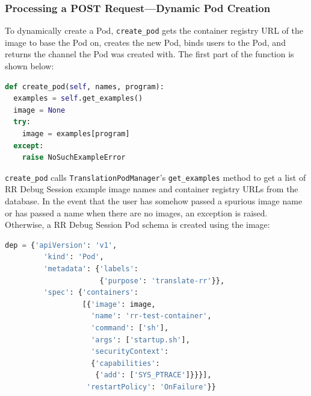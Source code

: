 \documentclass[12pt]{article}
\begin{document}


\subsubsection{Processing a POST Request---Dynamic Pod Creation} \label{dynamicc}

To dynamically create a Pod, \lstinline{create_pod} gets the container
registry URL of the image to base the Pod on, creates the new Pod,
binds users to the Pod, and returns the channel the Pod was created
with.  The first part of the function is shown below:

\begin{lstlisting}[language=Python,basicstyle=\linespread{0.5}\ttfamily,caption={Pod Creation 1},captionpos=b]
def create_pod(self, names, program):
  examples = self.get_examples()
  image = None
  try:
    image = examples[program]
  except:
    raise NoSuchExampleError
\end{lstlisting}

\lstinline{create_pod} calls \lstinline{TranslationPodManager}'s
\lstinline{get_examples} method to get a list of RR Debug Session
example image names and container registry URLs from the database.  In
the event that the user has somehow passed a spurious image name or has
passed a name when there are no images, an exception is raised.
Otherwise, a RR Debug Session Pod schema is created using the image:


\begin{lstlisting}[language=Python,basicstyle=\linespread{0.5}\ttfamily,caption={Pod Creation 2},captionpos=b]
  dep = {'apiVersion': 'v1',
         'kind': 'Pod',
         'metadata': {'labels':
                      {'purpose': 'translate-rr'}},
         'spec': {'containers':
                  [{'image': image,
                    'name': 'rr-test-container',
                    'command': ['sh'],
                    'args': ['startup.sh'],
                    'securityContext':
                    {'capabilities':
                     {'add': ['SYS_PTRACE']}}}],
                   'restartPolicy': 'OnFailure'}}
\end{lstlisting}
\end{document}
